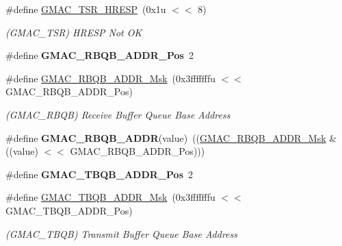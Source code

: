 \begin{DoxyCompactItemize}
\mbox{\label{group__SAMV71__GMAC_ga2d992e2aecf172a1b36467e808cf3aba}} 
\#define \mbox{\hyperlink{group__SAMV71__GMAC_ga2d992e2aecf172a1b36467e808cf3aba}{G\+M\+A\+C\+\_\+\+T\+S\+R\+\_\+\+H\+R\+E\+SP}}~(0x1u $<$$<$ 8)
\begin{DoxyCompactList}\small\item\em (G\+M\+A\+C\+\_\+\+T\+SR) H\+R\+E\+SP Not OK \end{DoxyCompactList}\item 
\mbox{\label{group__SAMV71__GMAC_ga206b5d503189817391330bbed9c6a794}} 
\#define {\bfseries G\+M\+A\+C\+\_\+\+R\+B\+Q\+B\+\_\+\+A\+D\+D\+R\+\_\+\+Pos}~2
\item 
\mbox{\label{group__SAMV71__GMAC_gac4d78e750c606111a7d0589d1d1c73ce}} 
\#define \mbox{\hyperlink{group__SAMV71__GMAC_gac4d78e750c606111a7d0589d1d1c73ce}{G\+M\+A\+C\+\_\+\+R\+B\+Q\+B\+\_\+\+A\+D\+D\+R\+\_\+\+Msk}}~(0x3fffffffu $<$$<$ G\+M\+A\+C\+\_\+\+R\+B\+Q\+B\+\_\+\+A\+D\+D\+R\+\_\+\+Pos)
\begin{DoxyCompactList}\small\item\em (G\+M\+A\+C\+\_\+\+R\+B\+QB) Receive Buffer Queue Base Address \end{DoxyCompactList}\item 
\mbox{\label{group__SAMV71__GMAC_ga5f6df78438a5b0f7f1386bb2060d1d81}} 
\#define {\bfseries G\+M\+A\+C\+\_\+\+R\+B\+Q\+B\+\_\+\+A\+D\+DR}(value)~((\mbox{\hyperlink{group__SAMV71__GMAC_gac4d78e750c606111a7d0589d1d1c73ce}{G\+M\+A\+C\+\_\+\+R\+B\+Q\+B\+\_\+\+A\+D\+D\+R\+\_\+\+Msk}} \& ((value) $<$$<$ G\+M\+A\+C\+\_\+\+R\+B\+Q\+B\+\_\+\+A\+D\+D\+R\+\_\+\+Pos)))
\item 
\mbox{\label{group__SAMV71__GMAC_ga4f2b7530a5633413c9095bd0aa695d87}} 
\#define {\bfseries G\+M\+A\+C\+\_\+\+T\+B\+Q\+B\+\_\+\+A\+D\+D\+R\+\_\+\+Pos}~2
\item 
\mbox{\label{group__SAMV71__GMAC_gaf89359a485905c67a16b25227df29edc}} 
\#define \mbox{\hyperlink{group__SAMV71__GMAC_gaf89359a485905c67a16b25227df29edc}{G\+M\+A\+C\+\_\+\+T\+B\+Q\+B\+\_\+\+A\+D\+D\+R\+\_\+\+Msk}}~(0x3fffffffu $<$$<$ G\+M\+A\+C\+\_\+\+T\+B\+Q\+B\+\_\+\+A\+D\+D\+R\+\_\+\+Pos)
\begin{DoxyCompactList}\small\item\em (G\+M\+A\+C\+\_\+\+T\+B\+QB) Transmit Buffer Queue Base Address \end{DoxyCompactList}\item 

\end{DoxyCompactItemize}
